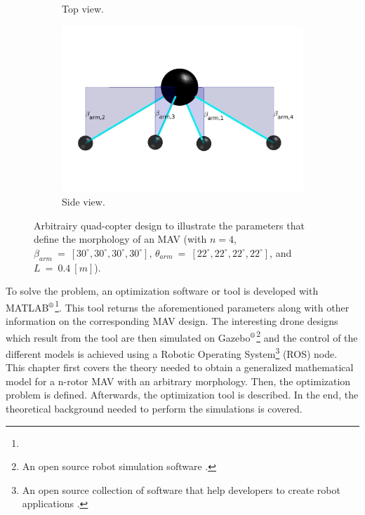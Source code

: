\begin{figure}[!h]
{\begin{subfigure}[b]{0.45\textwidth}
    \caption{Top view.} \label{fig:Quad_up}
  \end{subfigure}
  \hspace*{\fill} %
  \begin{subfigure}[b]{0.55\textwidth}
    \includegraphics[width=\linewidth]{images/drone_design2.jpg}
    \caption{Side view.} \label{fig:Quad_side}
  \end{subfigure}}
  \caption{Arbitrairy quad-copter design to illustrate the parameters that define the morphology of an
  MAV (with $n = 4$, $\beta_{arm}\ =\ [30^{\circ}, 30^{\circ}, 30^{\circ}, 30^{\circ}]$,
  $\theta_{arm}\ =\ [22^{\circ}, 22^{\circ}, 22^{\circ}, 22^{\circ}]$, and $L\ =\ 0.4\ [m]$).}
  \label{fig:drone_design}
\end{figure}

To solve the problem, an optimization software or tool is developed with
MATLAB$^\textrm{\textregistered}$\footnote{}.
This tool returns the aforementioned parameters along with other information on
the corresponding MAV design. The interesting drone designs which result from the tool are then simulated on
Gazebo$^\textrm{\textregistered}$\footnote{An open source robot simulation software \citep{noauthor_gazebo_nodate}.}
and the control of the different models is achieved using a Robotic Operating
System\footnote{An open source collection of software that help developers to
create robot applications \citep{rostutorials}.} (ROS) node.\\
This chapter first covers the theory needed to obtain a generalized mathematical
model for a n-rotor MAV with an arbitrary morphology. Then, the optimization
problem is defined. Afterwards, the optimization tool is described. In the end,
the theoretical background needed to perform the simulations is covered.

